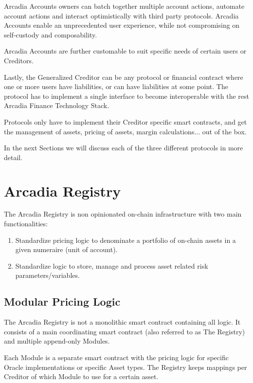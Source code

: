 \documentclass[sigconf,nonacm]{acmart}
\begin{document}
Arcadia Accounts owners can batch together multiple account actions, automate account actions and interact optimistically with third party protocols.
Arcadia Accounts enable an unprecedented user experience, while not compromising on self-custody and composability.

Arcadia Accounts are further customable to suit specific needs of certain users or Creditors.

Lastly, the Generalized Creditor can be any protocol or financial contract where one or more users have liabilities, or can have liabilities at some point.
The protocol has to implement a single interface to become interoperable with the rest Arcadia Finance Technology Stack.

Protocols only have to implement their Creditor specific smart contracts,
and get the management of assets, pricing of assets, margin calculations... out of the box.

In the next Sections we will discuss each of the three different protocols in more detail.

\section{Arcadia Registry}
\label{sec:arcadia-registry}

The Arcadia Registry is non opinionated on-chain infrastructure with two main functionalities:
\begin{enumerate}
    \item Standardize pricing logic to denominate a portfolio of on-chain assets in a given numeraire (unit of account).
    \item Standardize logic to store, manage and process asset related risk parameters/variables.
\end{enumerate}

\subsection{Modular Pricing Logic}
\label{subsec:modular-pricing-logic}
The Arcadia Registry is not a monolithic smart contract containing all logic.
It consists of a main coordinating smart contract (also referred to as The Registry) and multiple append-only Modules.

Each Module is a separate smart contract with the pricing logic for specific Oracle implementations or specific Asset types.
The Registry keeps mappings per Creditor of which Module to use for a certain asset.
\end{document}

